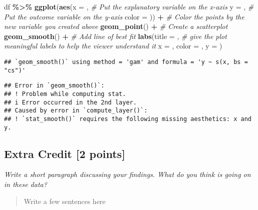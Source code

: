 \documentclass[
]{article}
\newenvironment{Shaded}{\begin{snugshade}}{\end{snugshade}}
\newcommand{\AttributeTok}[1]{\textcolor[rgb]{0.13,0.29,0.53}{#1}}
\newcommand{\CommentTok}[1]{\textcolor[rgb]{0.56,0.35,0.01}{\textit{#1}}}
\newcommand{\FunctionTok}[1]{\textcolor[rgb]{0.13,0.29,0.53}{\textbf{#1}}}
\newcommand{\NormalTok}[1]{#1}
\newcommand{\SpecialCharTok}[1]{\textcolor[rgb]{0.81,0.36,0.00}{\textbf{#1}}}
\newcommand{\StringTok}[1]{\textcolor[rgb]{0.31,0.60,0.02}{#1}}
\begin{document}
\begin{Shaded}
\begin{Highlighting}[]
\NormalTok{df }\SpecialCharTok{\%\textgreater{}\%}
  \FunctionTok{ggplot}\NormalTok{(}\FunctionTok{aes}\NormalTok{(}\AttributeTok{x =}\NormalTok{ , }\CommentTok{\# Put the explanatory variable on the x{-}axis}
             \AttributeTok{y =}\NormalTok{ , }\CommentTok{\# Put the outcome variable on the y{-}axis}
             \AttributeTok{color =}\NormalTok{ )) }\SpecialCharTok{+} \CommentTok{\# Color the points by the new variable you created above}
  \FunctionTok{geom\_point}\NormalTok{() }\SpecialCharTok{+} \CommentTok{\# Create a scatterplot}
  \FunctionTok{geom\_smooth}\NormalTok{() }\SpecialCharTok{+} \CommentTok{\# Add line of best fit}
  \FunctionTok{labs}\NormalTok{(}\AttributeTok{title =} \StringTok{\textquotesingle{}\textquotesingle{}}\NormalTok{, }\CommentTok{\# give the plot meaningful labels to help the viewer understand it}
       \AttributeTok{x =} \StringTok{\textquotesingle{}\textquotesingle{}}\NormalTok{,}
       \AttributeTok{color =} \StringTok{\textquotesingle{}\textquotesingle{}}\NormalTok{,}
       \AttributeTok{y =} \StringTok{\textquotesingle{}\textquotesingle{}}\NormalTok{)}
\end{Highlighting}
\end{Shaded}

\begin{verbatim}
## `geom_smooth()` using method = 'gam' and formula = 'y ~ s(x, bs = "cs")'
\end{verbatim}

\begin{verbatim}
## Error in `geom_smooth()`:
## ! Problem while computing stat.
## i Error occurred in the 2nd layer.
## Caused by error in `compute_layer()`:
## ! `stat_smooth()` requires the following missing aesthetics: x and y.
\end{verbatim}

\subsection{Extra Credit {[}2 points{]}}\label{extra-credit-2-points}

\emph{Write a short paragraph discussing your findings. What do you
think is going on in these data?}

\begin{quote}
Write a few sentences here
\end{quote}
\end{document}
